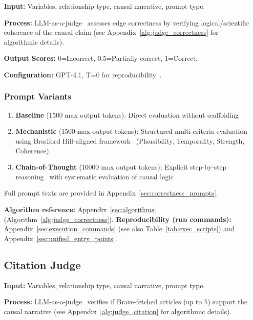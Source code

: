 \textbf{Input:} Variables, relationship type, causal narrative, prompt type.

\textbf{Process:} LLM-as-a-judge~\cite{zheng2024llmasajudge} assesses edge correctness by verifying logical/scientific coherence of the causal claim (see Appendix~\ref{alg:judge_correctness} for algorithmic details).

\textbf{Output Scores:} 0=Incorrect, 0.5=Partially correct, 1=Correct.

\textbf{Configuration:} GPT-4.1, T=0 for reproducibility~\citep{liu2023gevalnlgevaluationusing, zheng2024judging}.

\subsubsection{Prompt Variants}
\begin{enumerate}[noitemsep]
    \item \textbf{Baseline} (1500 max output tokens): Direct evaluation without scaffolding
    \item \textbf{Mechanistic} (1500 max output tokens): Structured multi-criteria evaluation using Bradford Hill-aligned framework~\cite{shimonovich2020bradford} (Plausibility, Temporality, Strength, Coherence)
    \item \textbf{Chain-of-Thought} (10000 max output tokens): Explicit step-by-step reasoning~\cite{kojima2022large} with systematic evaluation of causal logic
\end{enumerate}
Full prompt texts are provided in Appendix~\ref{sec:correctness_prompts}.

\textbf{Algorithm reference:} Appendix~\ref{sec:algorithms} (Algorithm~\ref{alg:judge_correctness}). \textbf{Reproducibility (run commands):} Appendix~\ref{sec:execution_commands} (see also Table~\ref{tab:exec_scripts}) and Appendix~\ref{sec:unified_entry_points}.

\subsection{Citation Judge}
\label{sec:citation_judge}

\textbf{Input:} Variables, relationship type, causal narrative, prompt type.

\textbf{Process:} LLM-as-a-judge~\cite{zheng2024llmasajudge} verifies if Brave-fetched articles (up to 5) support the causal narrative (see Appendix~\ref{alg:judge_citation} for algorithmic details).

